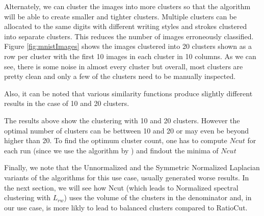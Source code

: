 \documentclass[10pt,a4paper, nocenter]{report}
\begin{document}
\begin{enumerate}
        Alternately, we can cluster the images into more clusters so that the algorithm will be able to create smaller and tighter clusters. Multiple clusters can be allocated  to the same digits with different writing styles and strokes clustered into separate clusters. This reduces the number of images erroneously classified. Figure \ref{fig:mnistImages} shows the images clustered into 20 clusters shown as a row per cluster with the first 10 images in each cluster in 10 columns. As we can see, there is some noise in almost every cluster but overall, most clusters are pretty clean and only a few of the clusters need to be manually inspected. 

        Also, it can be noted that various similarity functions produce slightly different results in the case of 10 and 20 clusters. 

        The results above show the clustering with 10 and 20 clusters. However the optimal number of clusters can be bettween 10 and 20 or may even be beyond higher than 20. To find the optimum cluster count, one has to compute $Ncut$ for each run (since we use the algorithm by \cite{Shi-Malik-maxcut-00}) and findout the minima of $Ncut$

        Finally, we note that the Unnormalized and the Symmetric Normalized Laplacian variants of the algorithms for this use case, usually generated worse results. In the next section, we will see how Ncut (which leads to Normalized spectral clustering with $L_{rw}$) uses the volume of the clusters in the denominator and, in our use case, is more likly to lead to balanced clusters compared to RatioCut.


\end{enumerate}
\end{document}
